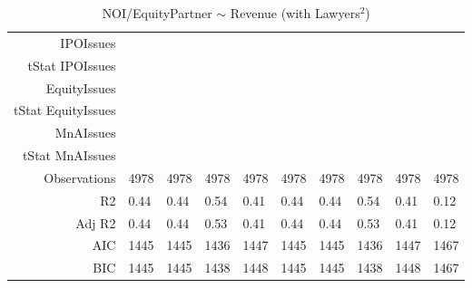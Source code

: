 \begin{table}[ht]
\begin{tabular}{rlllllllll}
  IPOIssues &  &  &  &  &  &  &  &  &  \\ 
  tStat IPOIssues &  &  &  &  &  &  &  &  &  \\ 
  EquityIssues &  &  &  &  &  &  &  &  &  \\ 
  tStat EquityIssues &  &  &  &  &  &  &  &  &  \\ 
  MnAIssues &  &  &  &  &  &  &  &  &  \\ 
  tStat MnAIssues &  &  &  &  &  &  &  &  &  \\ 
  Observations & 4978 & 4978 & 4978 & 4978 & 4978 & 4978 & 4978 & 4978 & 4978 \\ 
  R2 & 0.44 & 0.44 & 0.54 & 0.41 & 0.44 & 0.44 & 0.54 & 0.41 & 0.12 \\ 
  Adj R2 & 0.44 & 0.44 & 0.53 & 0.41 & 0.44 & 0.44 & 0.53 & 0.41 & 0.12 \\ 
  AIC & 1445 & 1445 & 1436 & 1447 & 1445 & 1445 & 1436 & 1447 & 1467 \\ 
  BIC & 1445 & 1445 & 1438 & 1448 & 1445 & 1445 & 1438 & 1448 & 1467 \\ 
   \hline
\end{tabular}
\caption{NOI/EquityPartner $\sim$ Revenue (with Lawyers$^2$)} 
\end{table}
